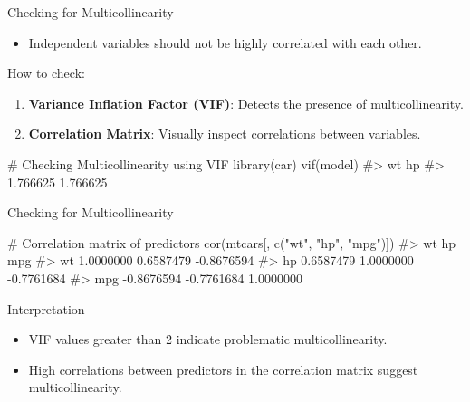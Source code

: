 \documentclass[
  18 pt,
  ignorenonframetext,
  aspectratio=1610,
]{beamer}
\newenvironment{Shaded}{\begin{snugshade}}{\end{snugshade}}
\newcommand{\CommentTok}[1]{\textcolor[rgb]{0.37,0.37,0.37}{#1}}
\newcommand{\FunctionTok}[1]{\textcolor[rgb]{0.28,0.35,0.67}{#1}}
\newcommand{\NormalTok}[1]{\textcolor[rgb]{0.00,0.23,0.31}{#1}}
\newcommand{\StringTok}[1]{\textcolor[rgb]{0.13,0.47,0.30}{#1}}
\providecommand{\tightlist}{%
  \setlength{\itemsep}{0pt}\setlength{\parskip}{0pt}}\usepackage{longtable,booktabs,array}
\begin{document}
\begin{frame}[fragile]{Checking for Multicollinearity}
\protect\hypertarget{checking-for-multicollinearity}{}
\begin{itemize}
\tightlist
\item
  Independent variables should not be highly correlated with each other.
\end{itemize}

\begin{block}{How to check:}
\protect\hypertarget{how-to-check-3}{}
\begin{enumerate}
\tightlist
\item
  \textbf{Variance Inflation Factor (VIF)}: Detects the presence of
  multicollinearity.
\item
  \textbf{Correlation Matrix}: Visually inspect correlations between
  variables.
\end{enumerate}

\begin{Shaded}
\begin{Highlighting}[]
\CommentTok{\# Checking Multicollinearity using VIF}
\FunctionTok{library}\NormalTok{(car)}
\FunctionTok{vif}\NormalTok{(model)}
\CommentTok{\#\textgreater{}       wt       hp }
\CommentTok{\#\textgreater{} 1.766625 1.766625}
\end{Highlighting}
\end{Shaded}
\end{block}
\end{frame}

\begin{frame}[fragile]{Checking for Multicollinearity}
\protect\hypertarget{checking-for-multicollinearity-1}{}
\begin{Shaded}
\begin{Highlighting}[]
\CommentTok{\# Correlation matrix of predictors}
\FunctionTok{cor}\NormalTok{(mtcars[, }\FunctionTok{c}\NormalTok{(}\StringTok{"wt"}\NormalTok{, }\StringTok{"hp"}\NormalTok{, }\StringTok{"mpg"}\NormalTok{)])}
\CommentTok{\#\textgreater{}             wt         hp        mpg}
\CommentTok{\#\textgreater{} wt   1.0000000  0.6587479 {-}0.8676594}
\CommentTok{\#\textgreater{} hp   0.6587479  1.0000000 {-}0.7761684}
\CommentTok{\#\textgreater{} mpg {-}0.8676594 {-}0.7761684  1.0000000}
\end{Highlighting}
\end{Shaded}

\begin{block}{Interpretation}
\protect\hypertarget{interpretation-7}{}
\begin{itemize}
\tightlist
\item
  VIF values greater than 2 indicate problematic multicollinearity.
\item
  High correlations between predictors in the correlation matrix suggest
  multicollinearity.
\end{itemize}
\end{block}
\end{frame}
\end{document}
